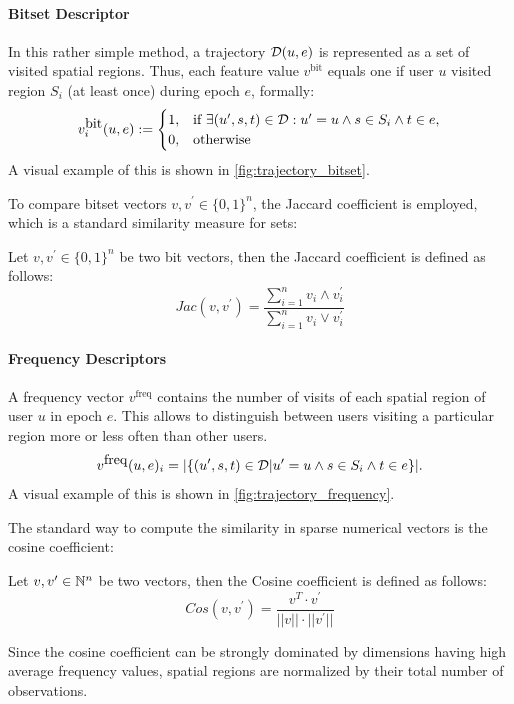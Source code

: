 \paragraph{Bitset Descriptor}
In this rather simple method, a trajectory $\mathcal{D}(u,e)$ is represented as a set of visited spatial regions. Thus, each feature value $v^{\mbox{bit}}$ equals one if user $u$ visited region $S_i$ (at least once) during epoch $e$, formally:
$$
v^{\mbox{bit}}_i (u,e):=
\begin{cases}
        1,& \text{if }\exists (u^\prime,s,t)\in\mathcal{D}: u^\prime=u \wedge s\in S_i \wedge t\in e,\\
        0, & \text{otherwise}
        \end{cases}
$$
A visual example of this is shown in \ref{fig:trajectory_bitset}.

To compare bitset vectors $v, v^\prime  \in \{0,1\}^n$, the Jaccard coefficient is employed, which is a standard similarity measure for sets:
\begin{definition}
Let $v,v^\prime \in \{0,1\}^n$ be two bit vectors, then the Jaccard coefficient is defined as follows:
\begin{displaymath}
Jac(v,v^\prime)=\frac{\sum_{i=1}^n v_i \wedge v_i^\prime}{\sum_{i=1}^n v_i \vee v_i^\prime}
\end{displaymath}
\end{definition}

\paragraph{Frequency Descriptors}
A frequency vector $v^{\mbox{freq}}$ contains the number of visits of each spatial region of user $u$ in epoch $e$. This allows to distinguish between users visiting a particular region more or less often than other users.
$$
v^{\mbox{freq}}(u,e)_i=|\{(u^\prime,s,t)\in\mathcal{D}|u^\prime=u \wedge s\in S_i \wedge t\in e\}|.
$$
A visual example of this is shown in \ref{fig:trajectory_frequency}.

The standard way to compute the similarity in sparse numerical vectors is the cosine coefficient:
\begin{definition}
Let $v,v^\prime \in \mathbb{N}^n$ be two vectors, then the Cosine coefficient is defined as follows:
\begin{displaymath}
Cos(v,v^\prime)=\frac{v^T \cdot v^\prime}{||v|| \cdot ||v^\prime||}
\end{displaymath}
\end{definition}
Since the cosine coefficient can be strongly dominated by dimensions having high average frequency values, spatial regions are normalized by their total number of observations.

